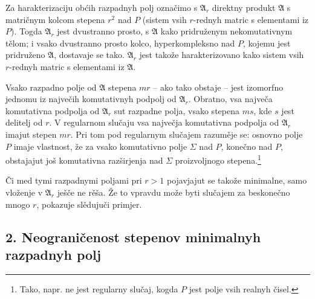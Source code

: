 \documentclass[11pt]{article}
\newcommand{\mA}{\mathfrak{A}}
\begin{document}
\noindent Za harakterizaciju obćih razpadnyh polj označimo s $\mA_r$ direktny produkt $\mA$ s matričnym kolcom stepena $r^2$ nad $P$ (sistem vsih $r$-rednyh matric s elementami iz $P$). Togda $\mA_r$ jest dvustranno prosto, s $\mA$ kako pridruženym nekomutativnym tělom; i vsako dvustranno prosto kolco, hyperkompleksno nad $P$, kojemu jest pridruženo $\mA$, dostavaje se tako. $\mA_r$ jest takože harakterizovano kako sistem vsih $r$-rednyh matric s elementami iz $\mA$.

\medskip

\noindent Vsako razpadno polje od $\mA$ stepena $mr$ -- ako tako obstaje -- jest izomorfno jednomu iz največih komutativnyh podpolj od $\mA_r$. Obratno, vsa največa komutativna podpolja od $\mA_r$ sut razpadne polja, vsako stepena $ms$, kde $s$ jest delitelj od $r$. V regularnom slučaju vsa največja komutativna podpolja od $\mA_r$ imajut stepen $mr$. Pri tom pod regularnym slučajem razuměje se: osnovno polje $P$ imaje vlastnost, že za vsako komutativno polje $\Sigma$ nad $P$, konečno nad $P$, obstajajut još komutativna razširjenja nad $\Sigma$ proizvoljnogo stepena.\footnote{Tako, napr. ne jest regularny slučaj, kogda $P$ jest polje vsih realnyh čisel.}

\medskip

\noindent Či med tymi razpadnymi poljami pri $r>1$ pojavjajut se takože minimalne, samo vloženje v $\mA_r$ ješče ne rěša. Že to vpravdu može byti slučajem za beskonečno mnogo $r$, pokazuje slědujuči primjer.

\subsection*{2. Neograničenost stepenov minimalnyh razpadnyh polj}
\end{document}
